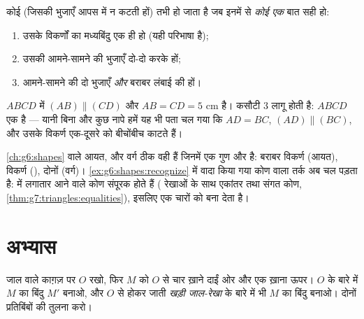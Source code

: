 \begin{theorem}[समांतर चतुर्भुज पहचानना]\label{thm:g7:central:recognize}
कोई  (जिसकी भुजाएँ आपस में न कटती हों) तभी 
हो जाता है जब इनमें से \emph{कोई एक} बात सही हो:
\begin{enumerate}
  \item उसके विकर्णों का मध्यबिंदु एक ही हो (यही परिभाषा है);
  \item उसकी आमने-सामने की भुजाएँ दो-दो करके  हों;
  \item आमने-सामने की दो भुजाएँ  \emph{और} बराबर लंबाई की
        हों।
\end{enumerate}
\end{theorem}
\admitted

\begin{example}\label{ex:g7:central:recognize}
$ABCD$ में $(AB) \parallel (CD)$ और $AB = CD = 5$ cm है। कसौटी 3
लागू होती है: $ABCD$ एक  है --- यानी बिना और कुछ नापे
हमें यह भी पता चल गया कि $AD = BC$, $(AD) \parallel (BC)$, और उसके
विकर्ण एक-दूसरे को बीचोंबीच काटते हैं।
\end{example}

\begin{remark}[ख़ास समांतर चतुर्भुज]
\cref{ch:g6:shapes} वाले आयत,  और वर्ग ठीक वही  हैं जिनमें एक गुण और है: बराबर विकर्ण (आयत),  विकर्ण
(), दोनों (वर्ग)। \cref{ex:g6:shapes:recognize} में वादा
किया गया कोण वाला तर्क अब चल पड़ता है:  में लगातार
आने वाले कोण संपूरक होते हैं ( रेखाओं के साथ एकांतर तथा संगत
कोण, \cref{thm:g7:triangles:equalities}), इसलिए एक  चारों को
 बना देता है।
\end{remark}

\section{अभ्यास}

\begin{exercise}[$\star$]\label{exo:g7:central:1}
जाल वाले काग़ज़ पर $O$ रखो, फिर $M$ को $O$ से चार ख़ाने दाईं ओर और
एक ख़ाना ऊपर। $O$ के बारे में $M$ का  बिंदु $M'$ बनाओ, और $O$
से होकर जाती \emph{खड़ी जाल-रेखा} के बारे में भी $M$ का  बिंदु
बनाओ। दोनों प्रतिबिंबों की तुलना करो।
\end{exercise}

